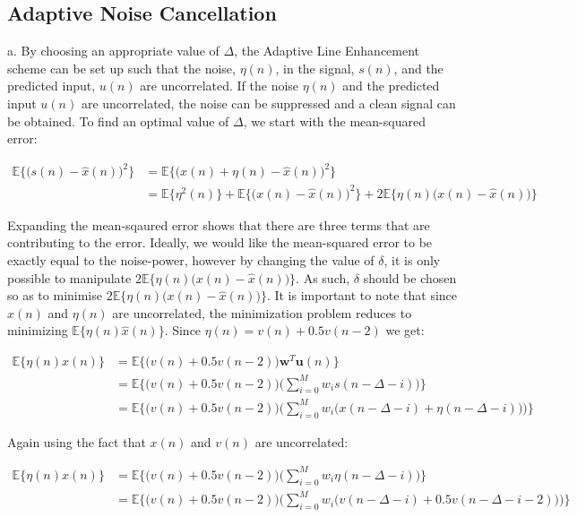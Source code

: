 \subsection{Adaptive Noise Cancellation}

\noindent{}a. By choosing an appropriate value of $\Delta$, the Adaptive Line Enhancement scheme can be set up such that the noise, $\eta(n)$, in the signal, $s(n)$, and the predicted input, $u(n)$ are uncorrelated. If the noise $\eta(n)$ and the predicted input $u(n)$ are uncorrelated, the noise can be suppressed and a clean signal can be obtained. To find an optimal value of $\Delta$, we start with the mean-squared error:

\begin{align*}
\mathbb{E}\bigg\{\bigg(s(n)-\hat{x}(n)\bigg)^2\bigg\} &= \mathbb{E}\bigg\{\bigg(x(n)+\eta(n)-\hat{x}(n)\bigg)^2\bigg\} \\
&=\mathbb{E}\{\eta^2(n)\} + \mathbb{E}\bigg\{\bigg(x(n)-\hat{x}(n)\bigg)^2\bigg\} + 2\mathbb{E}\bigg\{\eta(n)\bigg(x(n)-\hat{x}(n)\bigg)\bigg\}
\end{align*}

\noindent{}Expanding the mean-sqaured error shows that there are three terms that are contributing to the error. Ideally, we would like the mean-squared error to be exactly equal to the noise-power, however by changing the value of $\delta$, it is only possible to manipulate $2\mathbb{E}\bigg\{\eta(n)\bigg(x(n)-\hat{x}(n)\bigg)\bigg\}$. As such, $\delta$ should be chosen so as to minimise $2\mathbb{E}\bigg\{\eta(n)\bigg(x(n)-\hat{x}(n)\bigg)\bigg\}$. It is important to note that since $x(n)$ and $\eta(n)$ are uncorrelated, the minimization problem reduces to minimizing $\mathbb{E}\{\eta(n)\hat{x}(n)\}$. Since $\eta(n)=v(n) + 0.5v(n-2)$ we get:

\begin{align*}
\mathbb{E}\{\eta(n)\hat{x}(n)\} &= \mathbb{E}\bigg\{\bigg( v(n) + 0.5v(n-2)\bigg) \textbf{w}^T \textbf{u}(n)\bigg\} \\
&= \mathbb{E}\bigg\{\bigg( v(n) + 0.5v(n-2)\bigg) \bigg(\sum_{i=0}^{M}w_{i}s(n-\Delta-i)\bigg)\bigg\} \\
&= \mathbb{E}\bigg\{\bigg( v(n) + 0.5v(n-2)\bigg) \bigg(\sum_{i=0}^{M}w_{i}\big(x(n-\Delta-i)+\eta(n-\Delta-i)\big)\bigg)\bigg\} 
\end{align*}

\noindent{}Again using the fact that $x(n)$ and $v(n)$ are uncorrelated:

\begin{align*}
\mathbb{E}\{\eta(n)\hat{x}(n)\} &= \mathbb{E}\bigg\{\bigg( v(n) + 0.5v(n-2)\bigg) \bigg(\sum_{i=0}^{M}w_{i}\eta(n-\Delta-i)\bigg)\bigg\} \\
&= \mathbb{E}\bigg\{\bigg( v(n) + 0.5v(n-2)\bigg) \bigg(\sum_{i=0}^{M}w_{i}\big(v(n-\Delta-i)+0.5v(n-\Delta-i-2)\big)\bigg)\bigg\}
\end{align*}

